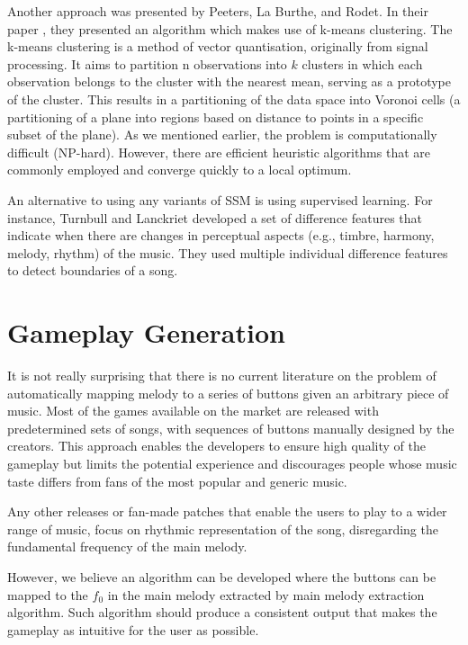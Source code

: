 Another approach was presented by Peeters, La Burthe, and Rodet. In their paper \cite{Peeters}, they presented an algorithm which makes use of k-means clustering. The k-means clustering is a method of vector quantisation, originally from signal processing. It aims to partition n observations into $k$ clusters in which each observation belongs to the cluster with the nearest mean, serving as a prototype of the cluster. This results in a partitioning of the data space into Voronoi cells (a partitioning of a plane into regions based on distance to points in a specific subset of the plane).
As we mentioned earlier, the problem is computationally difficult (NP-hard). However, there are efficient heuristic algorithms that are commonly employed and converge quickly to a local optimum.

An alternative to using any variants of SSM is using supervised learning. For instance, Turnbull and Lanckriet \cite{segmentsupervised} developed a set of difference features that indicate when there are changes in perceptual aspects (e.g., timbre, harmony, melody, rhythm) of the music. They used multiple individual difference features to detect boundaries of a song. 

\vspace{20pt}

\section{Gameplay Generation}

It is not really surprising that there is no current literature on the problem of automatically mapping melody to a series of buttons given an arbitrary piece of music. Most of the games available on the market are released with predetermined sets of songs, with sequences of buttons manually designed by the creators. This approach enables the developers to ensure high quality of the gameplay but limits the potential experience and discourages people whose music taste differs from fans of the most popular and generic music. 

Any other releases or fan-made patches that enable the users to play to a wider range of music, focus on rhythmic representation of the song, disregarding the fundamental frequency of the main melody.

However, we believe an algorithm can be developed where the buttons can be mapped to the $f_{0}$ in the main melody extracted by main melody extraction algorithm. Such algorithm should produce a consistent output that makes the gameplay as intuitive for the user as possible.
